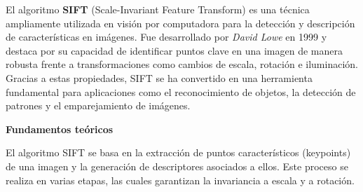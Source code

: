 \documentclass[a4paper]{article}
\begin{document}
  El algoritmo \textbf{SIFT} (Scale-Invariant Feature Transform) es una técnica ampliamente utilizada en visión por computadora para la detección y descripción de características en imágenes. Fue desarrollado por \textit{David Lowe} en 1999 y destaca por su capacidad de identificar puntos clave en una imagen de manera robusta frente a transformaciones como cambios de escala, rotación e iluminación. Gracias a estas propiedades, SIFT se ha convertido en una herramienta fundamental para aplicaciones como el reconocimiento de objetos, la detección de patrones y el emparejamiento de imágenes.
  
  \par\vspace{0.5cm}
  \textbf{Fundamentos teóricos}
  \par\vspace{0.5cm}
  
  El algoritmo SIFT se basa en la extracción de puntos característicos (keypoints) de una imagen y la generación de descriptores asociados a ellos. Este proceso se realiza en varias etapas, las cuales garantizan la invariancia a escala y a rotación.
  
\end{document}
